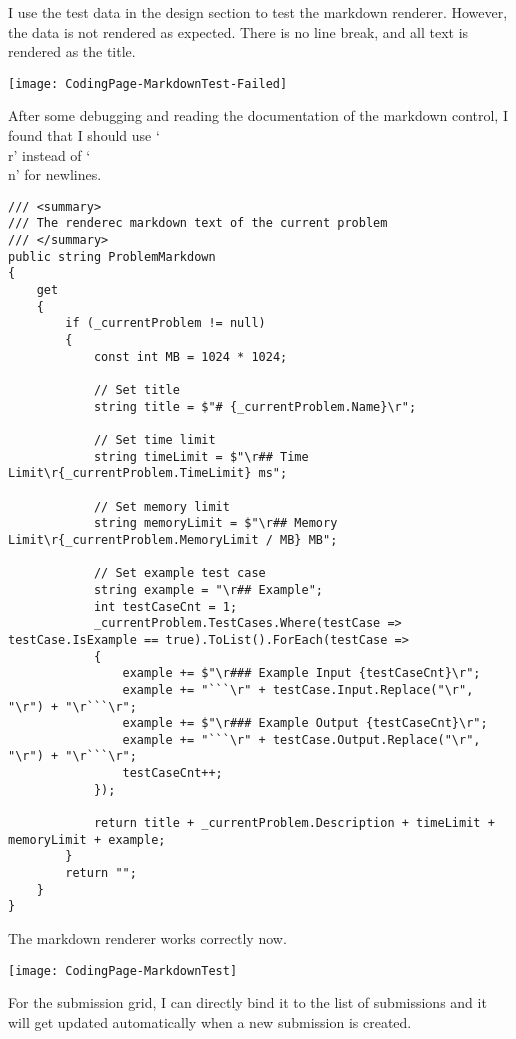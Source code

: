 \documentclass[report.tex]{subfiles}
\begin{document}
I use the test data in the design section to test the markdown renderer. However, the data is not rendered as expected. There is no line break, and all text is rendered as the title.

\texttt{[image: CodingPage-MarkdownTest-Failed]}

After some debugging and reading the documentation of the markdown control, I found that I should use `\\r' instead of `\\n' for newlines.

\begin{verbatim}
/// <summary>
/// The renderec markdown text of the current problem
/// </summary>
public string ProblemMarkdown
{
    get
    {
        if (_currentProblem != null)
        {
            const int MB = 1024 * 1024;
            
            // Set title
            string title = $"# {_currentProblem.Name}\r";
            
            // Set time limit
            string timeLimit = $"\r## Time Limit\r{_currentProblem.TimeLimit} ms";
            
            // Set memory limit
            string memoryLimit = $"\r## Memory Limit\r{_currentProblem.MemoryLimit / MB} MB";
            
            // Set example test case
            string example = "\r## Example";
            int testCaseCnt = 1;
            _currentProblem.TestCases.Where(testCase => testCase.IsExample == true).ToList().ForEach(testCase =>
            {
                example += $"\r### Example Input {testCaseCnt}\r";
                example += "```\r" + testCase.Input.Replace("\r", "\r") + "\r```\r";
                example += $"\r### Example Output {testCaseCnt}\r";
                example += "```\r" + testCase.Output.Replace("\r", "\r") + "\r```\r";
                testCaseCnt++;
            });

            return title + _currentProblem.Description + timeLimit + memoryLimit + example;
        }
        return "";
    }
}
\end{verbatim}

The markdown renderer works correctly now.

\texttt{[image: CodingPage-MarkdownTest]}

For the submission grid, I can directly bind it to the list of submissions and it will get updated automatically when a new submission is created.
\end{document}
